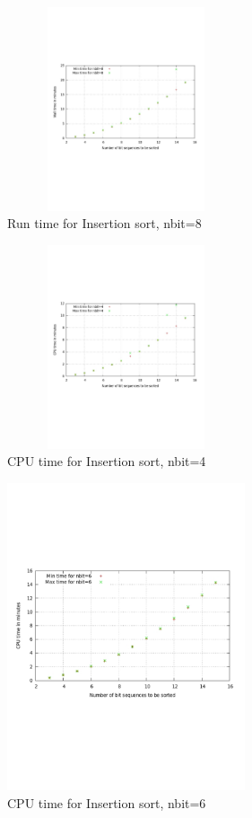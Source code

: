 \documentclass{acm_proc_article-sp}
\begin{document}
\begin{figure}[!h] %
\centering
\includegraphics[width=7cm, height=6cm]{fsort5.pdf} 
\caption{Run time for Insertion sort, nbit=8} 
\label{fig:image_sf5} %
\end{figure}


\begin{figure}[!h]%
\centering
\includegraphics[width=7cm, height=6cm]{fsort6.pdf} 
\caption{CPU time for Insertion sort, nbit=4} 
\label{fig:image_sf6} %
\end{figure}


\begin{figure}[!H] %
\centering
\includegraphics[width=7cm]{fsort8.pdf} 
\caption{CPU time for Insertion sort, nbit=6} 
\label{fig:image_sf8} %
\end{figure}
\end{document}
